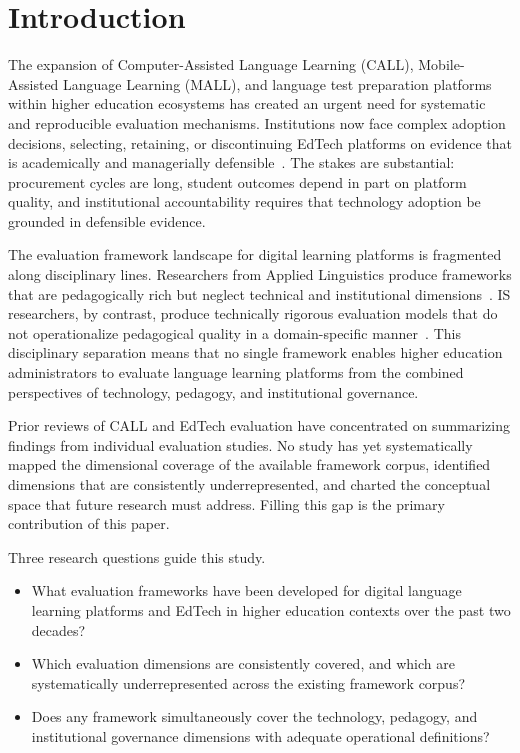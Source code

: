 \documentclass[conference]{IEEEtran}
\begin{document}
\section{Introduction}
\label{sec:intro}

The expansion of Computer-Assisted Language Learning (CALL),
Mobile-Assisted Language Learning (MALL), and language test
preparation platforms within higher education ecosystems has created
an urgent need for systematic and reproducible evaluation mechanisms.
Institutions now face complex adoption decisions, selecting,
retaining, or discontinuing EdTech platforms on evidence that is
academically and managerially defensible~\cite{b1,b2}. The stakes
are substantial: procurement cycles are long, student outcomes depend
in part on platform quality, and institutional accountability
requires that technology adoption be grounded in defensible evidence.

The evaluation framework landscape for digital learning platforms is
fragmented along disciplinary lines. Researchers from Applied
Linguistics produce frameworks that are pedagogically rich but
neglect technical and institutional dimensions~\cite{b3,b4}. IS
researchers, by contrast, produce technically rigorous evaluation
models that do not operationalize pedagogical quality in a
domain-specific manner~\cite{b5}. This disciplinary separation means
that no single framework enables higher education administrators to
evaluate language learning platforms from the combined perspectives
of technology, pedagogy, and institutional governance.

Prior reviews of CALL and EdTech evaluation have concentrated on
summarizing findings from individual evaluation studies. No study has
yet systematically mapped the dimensional coverage of the available
framework corpus, identified dimensions that are consistently
underrepresented, and charted the conceptual space that future
research must address. Filling this gap is the primary contribution
of this paper.

Three research questions guide this study.
\begin{itemize}
  \item[\textbf{RQ1:}] What evaluation frameworks have been developed
    for digital language learning platforms and EdTech in higher
    education contexts over the past two decades?
  \item[\textbf{RQ2:}] Which evaluation dimensions are consistently
    covered, and which are systematically underrepresented across the
    existing framework corpus?
  \item[\textbf{RQ3:}] Does any framework simultaneously cover the
    technology, pedagogy, and institutional governance dimensions
    with adequate operational definitions?
\end{itemize}
\end{document}
